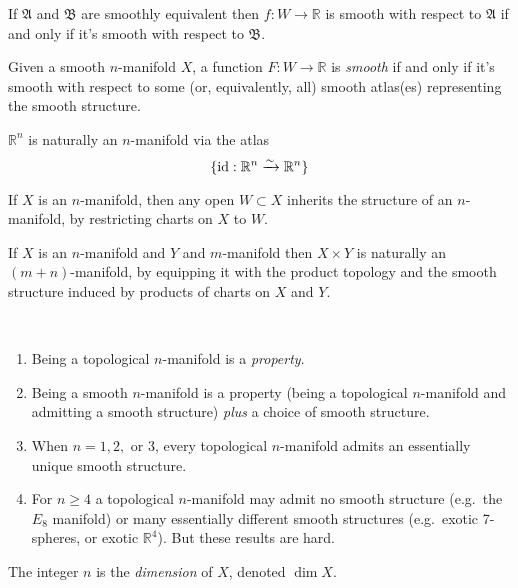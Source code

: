 \documentclass[a4paper,11pt]{article}
\begin{document}
	\begin{lem}
		If $\mathfrak{A}$ and $\mathfrak{B}$ are smoothly equivalent then $f: W \to \mathbb{R}$ is smooth with respect to $\mathfrak{A}$ if and only if it's smooth with respect to $\mathfrak{B}$.
	\end{lem}

	\begin{defi}
		Given a smooth $n$-manifold $X$, a function $F: W \to \mathbb{R}$ is \emph{smooth} if and only if it's smooth with respect to some (or, equivalently, all) smooth atlas(es) representing the smooth structure.
	\end{defi}

	\begin{ex}
		$\mathbb{R}^n$ is naturally an $n$-manifold via the atlas
		\[
			\{\operatorname{id}: \mathbb{R}^n \xrightarrow{\sim}\mathbb{R}^n\}
		\]
	\end{ex}
	\begin{ex}
		If $X$ is an $n$-manifold, then any open $W \subset X$ inherits the structure of an $n$-manifold, by restricting charts on $X$ to $W$.
	\end{ex}

	\begin{ex}
		If $X$ is an $n$-manifold and $Y$ and $m$-manifold then $X \times Y$ is naturally an $(m+n)$-manifold, by equipping it with the product topology and the smooth structure induced by products of charts on $X$ and $Y$.
	\end{ex}

	\begin{rmk} \ 
		\begin{enumerate}
			\item Being a topological $n$-manifold is a \emph{property}.
			\item Being a smooth $n$-manifold is a property (being a topological $n$-manifold and admitting a smooth structure) \emph{plus} a choice of smooth structure.
			\item When $n = 1,2,$ or $3$, every topological $n$-manifold admits an essentially unique smooth structure.
			\item For $n \geq 4$ a topological $n$-manifold may admit no smooth structure (e.g.\ the $E_8$ manifold) or many essentially different smooth structures (e.g.\ exotic 7-spheres, or exotic $\mathbb{R}^4$). But these results are hard. 
		\end{enumerate}
	\end{rmk}

	\begin{defi}
		The integer $n$ is the \emph{dimension} of $X$, denoted $\dim X$.
	\end{defi}
\end{document}
